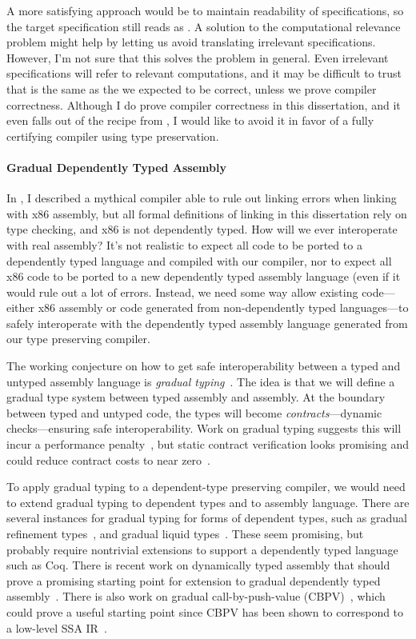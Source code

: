 A more satisfying approach would be to maintain readability of specifications,
so the target specification still reads as .
A solution to the computational relevance problem might help by letting us avoid
translating irrelevant specifications.
However, I'm not sure that this solves the problem in general.
Even irrelevant specifications will refer to relevant computations, and it may
be difficult to trust that \im{\sf^\div} is the same as the \im{\sf} we
expected to be correct, unless we prove compiler correctness.
Although I do prove compiler correctness in this dissertation, and
it even falls out of the recipe from , I would like to
avoid it in favor of a fully certifying compiler using type preservation.

\paragraph{Gradual Dependently Typed Assembly}
In , I described a mythical compiler able to rule out
linking errors when linking with x86 assembly, but all formal definitions of
linking in this dissertation rely on type checking, and x86 is not dependently
typed.
How will we ever interoperate with real assembly?
It's not realistic to expect all code to be ported to a dependently typed
language and compiled with our compiler, nor to expect all x86 code to be ported
to a new dependently typed assembly language (even if it would rule out a lot of
errors.
Instead, we need some way allow existing code---either
x86 assembly or code generated from non-dependently typed languages---to safely
interoperate with the dependently typed assembly language generated from our
type preserving compiler.

The working conjecture on how to get safe interoperability between a typed and
untyped assembly language is \emph{gradual typing}~\cite{ahmed2015:snapl}.
The idea is that we will define a gradual type system between typed assembly and
assembly.
At the boundary between typed and untyped code, the types will become
\emph{contracts}---dynamic checks---ensuring safe interoperability.
Work on gradual typing suggests this will incur a performance
penalty~\cite{takikawa2016}, but static contract verification looks promising
and could reduce contract costs to near zero~\cite{tobin-hochstadt2012}.

To apply gradual typing to a dependent-type preserving compiler, we would need
to extend gradual typing to dependent types and to assembly language.
There are several instances for gradual typing for forms of dependent types,
such as gradual refinement types~\cite{lehmann2017}, and gradual liquid
types~\cite{vazou2018}.
These seem promising, but probably require nontrivial extensions to support a
dependently typed language such as Coq.
There is recent work on dynamically typed assembly that should prove a promising
starting point for extension to gradual dependently typed assembly~\cite{hernandez2018}.
There is also work on gradual call-by-push-value (CBPV)~\cite{new2019:gtt}, which could
prove a useful starting point since CBPV has been shown to correspond to a
low-level SSA IR~\cite{garbuzov2018:cbpv-ssa}.

